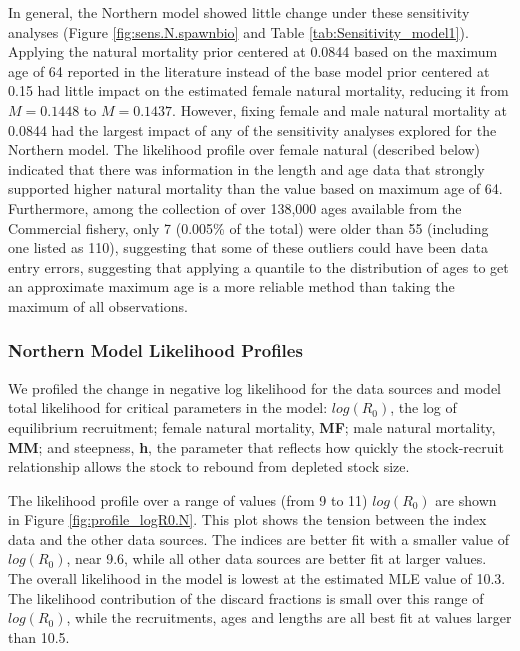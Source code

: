 \documentclass[12pt,]{article}
\begin{document}
In general, the Northern model showed little change under these
sensitivity analyses (Figure \ref{fig:sens.N.spawnbio} and Table
\ref{tab:Sensitivity_model1}). Applying the natural mortality prior
centered at 0.0844 based on the maximum age of 64 reported in the
literature instead of the base model prior centered at 0.15 had little
impact on the estimated female natural mortality, reducing it from
\(M=0.1448\) to \(M=0.1437\). However, fixing female and male natural
mortality at 0.0844 had the largest impact of any of the sensitivity
analyses explored for the Northern model. The likelihood profile over
female natural (described below) indicated that there was information in
the length and age data that strongly supported higher natural mortality
than the value based on maximum age of 64. Furthermore, among the
collection of over 138,000 ages available from the Commercial fishery,
only 7 (0.005\% of the total) were older than 55 (including one listed
as 110), suggesting that some of these outliers could have been data
entry errors, suggesting that applying a quantile to the distribution of
ages to get an approximate maximum age is a more reliable method than
taking the maximum of all observations.

\subsubsection{Northern Model Likelihood
Profiles}\label{northern-model-likelihood-profiles}

We profiled the change in negative log likelihood for the data sources
and model total likelihood for critical parameters in the model:
\textbf{\(log(R_0)\)}, the log of equilibrium recruitment; female
natural mortality, \textbf{MF}; male natural mortality, \textbf{MM}; and
steepness, \textbf{h}, the parameter that reflects how quickly the
stock-recruit relationship allows the stock to rebound from depleted
stock size.

The likelihood profile over a range of values (from 9 to 11)
\(log(R_0)\) are shown in Figure \ref{fig:profile_logR0.N}. This plot
shows the tension between the index data and the other data sources. The
indices are better fit with a smaller value of \(log(R_0)\), near 9.6,
while all other data sources are better fit at larger values. The
overall likelihood in the model is lowest at the estimated MLE value of
10.3. The likelihood contribution of the discard fractions is small over
this range of \(log(R_0)\), while the recruitments, ages and lengths are
all best fit at values larger than 10.5.
\end{document}
